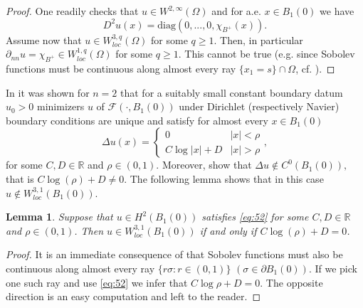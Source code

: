 \documentclass[twoside,11pt]{article}
\newtheorem{lemma}{Lemma}
\theoremstyle{definition}
\begin{document}
\begin{proof}
    One readily checks that $u \in W^{2,\infty}(\Omega)$ and for a.e. $x \in B_1(0)$ we have
    \begin{equation*}
        D^2 u (x) = \mathrm{diag}(0,...,0,\chi_{B^+}(x)).
    \end{equation*}
    Assume now that $u \in W^{3,q}_{loc}(\Omega)$ for some $q \geq 1$. Then, in particular $\partial_{nn} u = \chi_{B^+} \in W^{1,q}_{loc}(\Omega)$ for some $q \geq 1$. This cannot be true (e.g. since Sobolev functions must be continuous along almost every ray $\{x_1 = s \} \cap \Omega$, cf. \cite[Theorem 4.21]{EvansGariepy}). 
\end{proof}

In \cite[Example 2 and 4]{GMMathAnn} it was shown for $n=2$ that for a suitably small constant boundary datum $u_0 > 0$ minimizers $u$ of $\mathcal{F}(\cdot, B_1(0))$ under Dirichlet (respectively Navier) boundary conditions are unique and satisfy for almost every $x \in B_1(0)$
\begin{equation}\label{eq:52}
    \Delta u(x) = \begin{cases} 0 & |x| < \rho  \\
        C\log|x| + D  & |x| > \rho 
    \end{cases},
\end{equation}
for some $C,D \in \mathbb{R}$ and $\rho \in (0,1)$. 
Moreover, \cite[Remark 9 and Remark 11]{GMMathAnn} show that $\Delta u \not \in C^0(B_1(0)),$ that is $C \log(\rho)+ D \neq 0$. The following lemma shows that in this case $u \not \in W^{3,1}_{loc}(B_1(0))$.

\begin{lemma}
    Suppose that $u \in H^2(B_1(0))$ satisfies \eqref{eq:52} for some $C,D \in \mathbb{R}$ and $\rho \in (0,1)$. Then $u \in W^{3,1}_{loc}(B_1(0))$ if and only if $C \log(\rho) + D= 0$.
\end{lemma}
\begin{proof}
   It is an immediate consequence of \cite[Theorem 4.21]{EvansGariepy} that Sobolev functions must also be continuous along almost every ray $\{ r \sigma : r \in (0,1) \}$ $(\sigma \in \partial B_1(0))$. If we pick one such ray and use \eqref{eq:52} we infer that $C \log \rho + D = 0$. The opposite direction is an easy computation and left to the reader.  
\end{proof}
\end{document}
